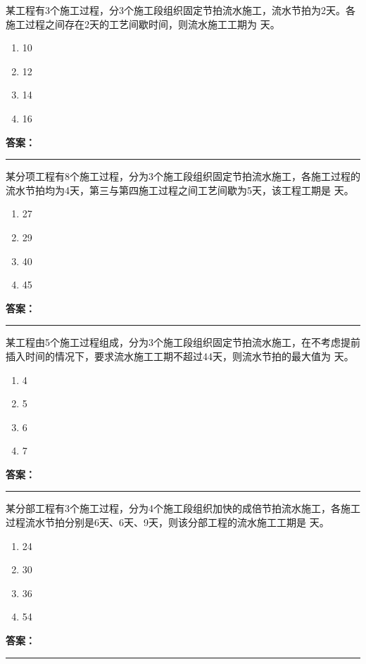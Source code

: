 \documentclass[UTF8,fontset=fandol,11pt]{ctexart}
\newcommand{\answerline}{\textcolor{answerred}{\rule{2.4cm}{0.7pt}}}
\begin{document}
\vspace{0.2em}

\begin{quizbox}[title={第 10 题}]
某工程有3个施工过程，分3个施工段组织固定节拍流水施工，流水节拍为2天。各施工过程之间存在2天的工艺间歇时间，则流水施工工期为 天。\\
\begin{enumerate}[label=\Alph*.]
\item 10
\item 12
\item 14
\item 16
\end{enumerate}
\textbf{\textcolor{answerred}{答案：}} \answerline
\end{quizbox}

\vspace{0.2em}

\begin{quizbox}[title={第 11 题}]
某分项工程有8个施工过程，分为3个施工段组织固定节拍流水施工，各施工过程的流水节拍均为4天，第三与第四施工过程之间工艺间歇为5天，该工程工期是 天。\\
\begin{enumerate}[label=\Alph*.]
\item 27
\item 29
\item 40
\item 45
\end{enumerate}
\textbf{\textcolor{answerred}{答案：}} \answerline
\end{quizbox}

\vspace{0.2em}

\begin{quizbox}[title={第 12 题}]
某工程由5个施工过程组成，分为3个施工段组织固定节拍流水施工，在不考虑提前插入时间的情况下，要求流水施工工期不超过44天，则流水节拍的最大值为 天。\\
\begin{enumerate}[label=\Alph*.]
\item 4
\item 5
\item 6
\item 7
\end{enumerate}
\textbf{\textcolor{answerred}{答案：}} \answerline
\end{quizbox}

\vspace{0.2em}

\begin{quizbox}[title={第 13 题}]
某分部工程有3个施工过程，分为4个施工段组织加快的成倍节拍流水施工，各施工过程流水节拍分别是6天、6天、9天，则该分部工程的流水施工工期是 天。\\
\begin{enumerate}[label=\Alph*.]
\item 24
\item 30
\item 36
\item 54
\end{enumerate}
\textbf{\textcolor{answerred}{答案：}} \answerline
\end{quizbox}
\end{document}
